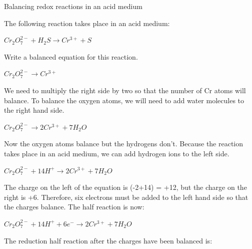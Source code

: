 \begin{wex}{Balancing redox reactions in an acid medium\\}{The following reaction takes place in an acid medium:

\begin{center}
\rm${Cr_{2}O_{7}^{2-} + H_{2}S \rightarrow Cr^{3+} + S}$
\end{center}

Write a balanced equation for this reaction.\\}

{

\begin{center}
\rm${Cr_{2}O_{7}^{2-} \rightarrow Cr^{3+}}$\\
\end{center}

We need to multiply the right side by two so that the number of Cr atoms will balance. To balance the oxygen atoms, we will need to add water molecules to the right hand side. 

\begin{center}
\rm${Cr_{2}O_{7}^{2-} \rightarrow 2Cr^{3+} + 7H_{2}O}$
\end{center}

Now the oxygen atoms balance but the hydrogens don't. Because the reaction takes place in an acid medium, we can add hydrogen ions to the left side.

\begin{center}
\rm${Cr_{2}O_{7}^{2-} + 14H^{+} \rightarrow 2Cr^{3+} + 7H_{2}O}$\\
\end{center}

The charge on the left of the equation is (-2+14) = +12, but the charge on the right is +6. Therefore, six electrons must be added to the left hand side so that the charges balance. The half reaction is now:

\begin{center}
\rm${Cr_{2}O_{7}^{2-} + 14H^{+} + 6e^{-} \rightarrow 2Cr^{3+} + 7H_{2}O}$\\
\end{center}

The reduction half reaction after the charges have been balanced is:

}
\end{wex}
